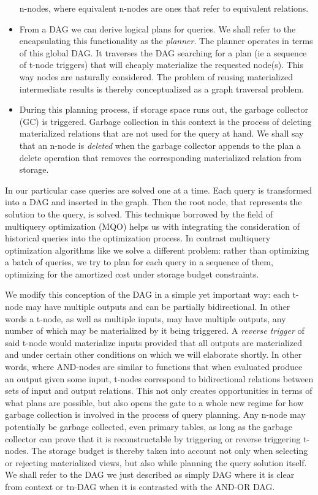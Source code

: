 \begin{itemize}
  n-nodes, where equivalent n-nodes are ones that refer to equivalent
  relations.
\item From a DAG we can derive logical plans for queries. We shall refer
  to the encapsulating this functionality as the \emph{planner}. The
  planner operates in terms of this global DAG. It traverses the DAG
  searching for a plan (ie a sequence of t-node triggers) that will
  cheaply materialize the requested node(s). This way nodes are
  naturally considered. The problem of reusing materialized
  intermediate results is thereby conceptualized as a graph traversal
  problem.
\item During this planning process, if storage space runs out, the
  garbage collector (GC) is triggered. Garbage collection in this
  context is the process of deleting materialized relations that are
  not used for the query at hand. We shall say that an n-node is
  \emph{deleted} when the garbage collector appends to the plan a delete
  operation that removes the corresponding materialized relation
  from storage.
\end{itemize}

In our particular case queries are solved one at a time. Each query is
transformed into a DAG and inserted in the graph. Then the root node,
that represents the solution to the query, is solved. This technique
borrowed by the field of multiquery optimization (MQO) helps us with
integrating the consideration of historical queries into the
optimization process. In contrast multiquery optimization algorithms
like \cite{mistryMaterializedViewSelection2001} we solve a different
problem: rather than optimizing a batch of queries, we try to plan for
each query in a sequence of them, optimizing for the amortized cost
under storage budget constraints.

We modify this conception of the DAG in a simple yet important way:
each t-node may have multiple outputs and can be partially
bidirectional. In other words a t-node, as well as multiple inputs,
may have multiple outputs, any number of which may be materialized by
it being triggered. A \emph{reverse trigger} of said t-node would
materialize inputs provided that all outputs are materialized and
under certain other conditions on which we will elaborate shortly. In
other words, where AND-nodes are similar to functions that when
evaluated produce an output given some input, t-nodes correspond to
bidirectional relations between sets of input and output
relations. This not only creates opportunities in terms of what plans
are possible, but also opens the gate to a whole new regime for how
garbage collection is involved in the process of query planning. Any
n-node may potentially be garbage collected, even primary tables, as
long as the garbage collector can prove that it is reconstructable by
triggering or reverse triggering t-nodes. The storage budget is
thereby taken into account not only when selecting or rejecting
materialized views, but also while planning the query solution
itself. We shall refer to the DAG we just described as simply DAG
where it is clear from context or tn-DAG when it is contrasted with
the AND-OR DAG.

